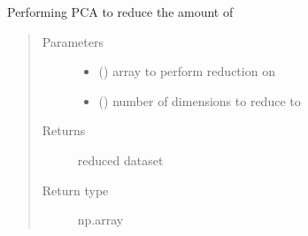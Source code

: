 \documentclass[letterpaper,10pt,english]{sphinxmanual}
\begin{document}

\begin{fulllineitems}
\label{\detokenize{index:Src.preprocessing.dimension_reduce}}
Performing PCA to reduce the amount of
\begin{quote}\begin{description}
\item[{Parameters}] \leavevmode\begin{itemize}
\item {} 
 () \textendash{} array to perform reduction on

\item {} 
 () \textendash{} number of dimensions to reduce to

\end{itemize}

\item[{Returns}] \leavevmode
reduced dataset

\item[{Return type}] \leavevmode
np.array

\end{description}\end{quote}

\end{fulllineitems}

\end{document}

